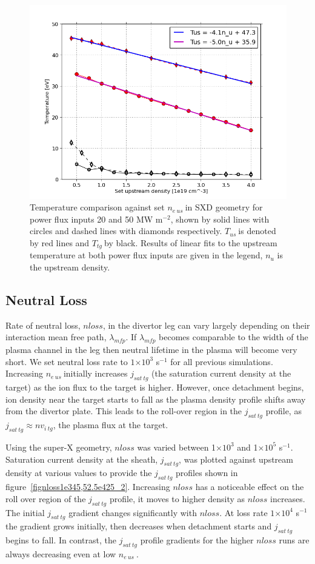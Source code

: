 \documentclass[12pt]{article}  %
\providecommand{\e}[1]{\ensuremath{\times 10^{#1}}} %
\providecommand{\pow}[1]{{$^{#1}$}} %
\providecommand{\neus}{$n_{e~us}~$} %
\providecommand{\Tus}{$T_{us}~$} %
\providecommand{\Ttg}{$T_{tg}~$} %
\begin{document}
\begin{figure}
\includegraphics[scale=0.6]{Figures/sol1d/SXDPFfit.png}
\centering
\caption{Temperature comparison against set \neus in SXD geometry for power flux inputs 20 and 50 MW m\pow{-2}, shown by solid lines with circles and dashed lines with diamonds respectively. \Tus is denoted by red lines and \Ttg by black. Results of linear fits to the upstream temperature at both power flux inputs are given in the legend, $n_u$ is the upstream density.}\label{figSXDPFfit}
\end{figure}


\subsection{Neutral Loss}\label{ssecNloss}
Rate of neutral loss, $nloss$, in the divertor leg can vary largely depending on their interaction mean free path, $\lambda_{mfp}$. If $\lambda_{mfp}$ becomes comparable to the width of the plasma channel in the leg then neutral lifetime in the plasma will become very short. We set neutral loss rate to $1\e{3}$ s\pow{-1} for all previous simulations. Increasing \neus initially increases $j_{sat~tg}$ (the saturation current density at the target) as the ion flux to the target is higher. However, once detachment begins, ion density near the target starts to fall as the plasma density profile shifts away from the divertor plate. This leads to the roll-over region in the $j_{sat~tg}$ profile, as $j_{sat~tg} \approx nv_{i~tg}$, the plasma flux at the target.

Using the super-X geometry, $nloss$ was varied between 1\e{3} and 1\e{5} s\pow{-1}. Saturation current density at the sheath, $j_{sat~tg}$, was plotted against upstream density at various values to provide the $j_{sat~tg}$ profiles shown in figure~\ref{fignloss1e345,52.5e425_2}. Increasing $nloss$ has a noticeable effect on the roll over region of the $j_{sat~tg}$ profile, it moves to higher density as $nloss$ increases. The initial $j_{sat~tg}$ gradient changes significantly with $nloss$. At loss rate $1\e{4}$ s\pow{-1} the gradient grows initially, then decreases when detachment starts and $j_{sat~tg}$ begins to fall. In contrast, the $j_{sat~tg}$ profile gradients for the higher $nloss$ runs are always decreasing even at low \neus. 
\end{document}
